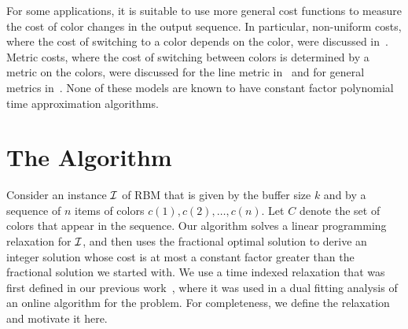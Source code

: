 \documentclass[11pt]{article}
\begin{document}
For some applications, it is suitable to use more general cost functions to
measure the cost of color changes in the output sequence. In particular,
non-uniform costs, where the cost of switching to a color depends on
the color, were discussed in~\cite{EW05,AR10,ACER11}. Metric costs,
where the cost of switching between colors is determined by a metric on
the colors, were discussed for the line metric in~\cite{KP06,GS07} and for
general metrics in~\cite{ERW07}. None of these models are known to have
constant factor polynomial time approximation algorithms.



\section{The Algorithm}

Consider an instance ${\cal I}$ of RBM that is given by the buffer
size $k$ and by a sequence of $n$ items of colors $c(1),c(2),\dots,c(n)$.
Let $C$ denote the set of colors that appear in the sequence.
Our algorithm solves a linear programming relaxation for ${\cal I}$,
and then uses the fractional optimal solution to
derive an integer solution whose cost is at most a constant factor
greater than the fractional solution we started with. We use a time
indexed relaxation that was first defined in our previous work~\cite{AR10},
where it was used in a dual fitting analysis of an online algorithm for the
problem. For completeness, we define the relaxation and motivate it here.
\end{document}
